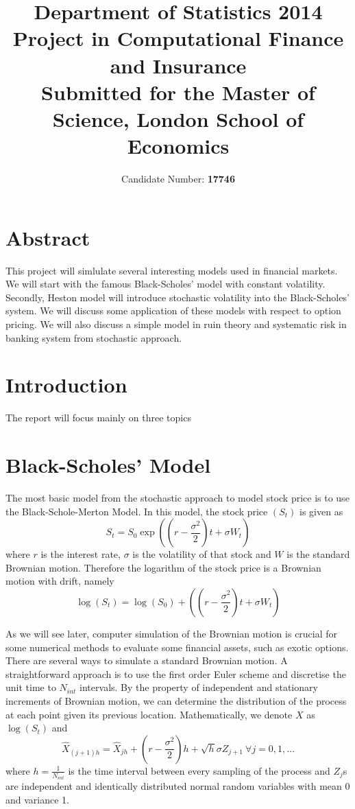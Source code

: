 \documentclass[a4paper, 11pt]{article}
\begin{document}
\title{Department of Statistics 2014\\ {\bf Project in Computational Finance and Insurance}\\ {\small Submitted for the Master of Science, London School of Economics} }
\author{Candidate Number: \bf 17746}
\maketitle
\vfill
\section*{Abstract}
This project will simlulate several interesting models used in financial markets. We will start with the famous Black-Scholes' model with constant volatility. Secondly, Heston model will introduce stochastic volatility into the Black-Scholes' system. We will discuss some application of these models with respect to option pricing.
We will also discuss a simple model in ruin theory and systematic risk in banking system from stochastic approach.

\newpage

\tableofcontents
\vfill
\section{Introduction}
The report will focus mainly on three topics 

\section{Black-Scholes' Model}
The most basic model from the stochastic approach to model stock price is to use the Black-Schole-Merton Model. In this model, the stock price $(S_t)$ is given as
$$S_t = S_0 \exp\left( (r - \frac{\sigma^2}{2} )t + \sigma W_t \right)$$
where $r$ is the interest rate, $\sigma$ is the volatility of that stock and $W$ is the standard Brownian motion. Therefore the logarithm of the stock price is a Brownian motion with drift, namely 
$$\log(S_t) = \log(S_0) + ((r - \frac{\sigma^2}{2} )t + \sigma W_t )$$

As we will see later, computer simulation of the Brownian motion is crucial for some numerical methods to evaluate some financial assets, such as exotic options.\\

There are several ways to simulate a standard Brownian motion. A straightforward approach is to use the first order Euler scheme and discretise the unit time to $N_{int}$ intervals. By the property of independent and stationary increments of Brownian motion, we can determine the distribution of the process at each point given its previous location. Mathematically, we denote $X$ as $\log(S_t)$ and
$$ \hat{X}_{(j+1)h} = \hat{X}_{jh} +( r-\frac{\sigma^2}{2})h +\sqrt{h} \sigma Z_{j+1}\  \forall j = 0, 1, \dots $$
where $h = \frac{1}{N_{int}}$ is the time interval between every sampling of the process and $Z_j$s are independent and identically distributed normal random variables with mean 0 and variance 1.\\
\end{document}

